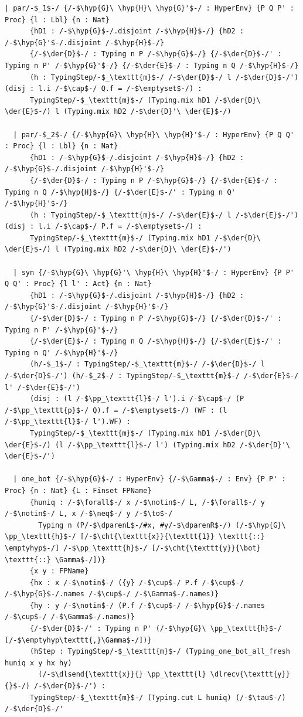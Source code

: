 \begin{lstlisting}[language=Lean4,
  caption={The typed transition relation \texttt{TypingStep}$_{\texttt{m}}$.},
  label={lst:app-typingstep}]
  | par/-$_1$-/ {/-$\hyp{G}\ \hyp{H}\ \hyp{G}'$-/ : HyperEnv} {P Q P' : Proc} {l : Lbl} {n : Nat}
      {hD1 : /-$\hyp{G}$-/.disjoint /-$\hyp{H}$-/} {hD2 : /-$\hyp{G}'$-/.disjoint /-$\hyp{H}$-/}
      {/-$\der{D}$-/ : Typing n P /-$\hyp{G}$-/} {/-$\der{D}$-/' : Typing n P' /-$\hyp{G}'$-/} {/-$\der{E}$-/ : Typing n Q /-$\hyp{H}$-/}
      (h : TypingStep/-$_\texttt{m}$-/ /-$\der{D}$-/ l /-$\der{D}$-/') (disj : l.i /-$\cap$-/ Q.f = /-$\emptyset$-/) :
      TypingStep/-$_\texttt{m}$-/ (Typing.mix hD1 /-$\der{D}\ \der{E}$-/) l (Typing.mix hD2 /-$\der{D}'\ \der{E}$-/)

  | par/-$_2$-/ {/-$\hyp{G}\ \hyp{H}\ \hyp{H}'$-/ : HyperEnv} {P Q Q' : Proc} {l : Lbl} {n : Nat}
      {hD1 : /-$\hyp{G}$-/.disjoint /-$\hyp{H}$-/} {hD2 : /-$\hyp{G}$-/.disjoint /-$\hyp{H}'$-/}
      {/-$\der{D}$-/ : Typing n P /-$\hyp{G}$-/} {/-$\der{E}$-/ : Typing n Q /-$\hyp{H}$-/} {/-$\der{E}$-/' : Typing n Q' /-$\hyp{H}'$-/}
      (h : TypingStep/-$_\texttt{m}$-/ /-$\der{E}$-/ l /-$\der{E}$-/') (disj : l.i /-$\cap$-/ P.f = /-$\emptyset$-/) :
      TypingStep/-$_\texttt{m}$-/ (Typing.mix hD1 /-$\der{D}\ \der{E}$-/) l (Typing.mix hD2 /-$\der{D}\ \der{E}$-/')

  | syn {/-$\hyp{G}\ \hyp{G}'\ \hyp{H}\ \hyp{H}'$-/ : HyperEnv} {P P' Q Q' : Proc} {l l' : Act} {n : Nat}
      {hD1 : /-$\hyp{G}$-/.disjoint /-$\hyp{H}$-/} {hD2 : /-$\hyp{G}'$-/.disjoint /-$\hyp{H}'$-/}
      {/-$\der{D}$-/ : Typing n P /-$\hyp{G}$-/} {/-$\der{D}$-/' : Typing n P' /-$\hyp{G}'$-/}
      {/-$\der{E}$-/ : Typing n Q /-$\hyp{H}$-/} {/-$\der{E}$-/' : Typing n Q' /-$\hyp{H}'$-/}
      (h/-$_1$-/ : TypingStep/-$_\texttt{m}$-/ /-$\der{D}$-/ l /-$\der{D}$-/') (h/-$_2$-/ : TypingStep/-$_\texttt{m}$-/ /-$\der{E}$-/ l' /-$\der{E}$-/')
      (disj : (l /-$\pp_\texttt{l}$-/ l').i /-$\cap$-/ (P /-$\pp_\texttt{p}$-/ Q).f = /-$\emptyset$-/) (WF : (l /-$\pp_\texttt{l}$-/ l').WF) :
      TypingStep/-$_\texttt{m}$-/ (Typing.mix hD1 /-$\der{D}\ \der{E}$-/) (l /-$\pp_\texttt{l}$-/ l') (Typing.mix hD2 /-$\der{D}'\ \der{E}$-/')

  | one_bot {/-$\hyp{G}$-/ : HyperEnv} {/-$\Gamma$-/ : Env} {P P' : Proc} {n : Nat} {L : Finset FPName}
      {huniq : /-$\forall$-/ x /-$\notin$-/ L, /-$\forall$-/ y /-$\notin$-/ L, x /-$\neq$-/ y /-$\to$-/
        Typing n (P/-$\dparenL$-/#x, #y/-$\dparenR$-/) (/-$\hyp{G}\ \pp_\texttt{h}$-/ [/-$\cht{\texttt{x}}{\texttt{1}} \texttt{::} \emptyhyp$-/] /-$\pp_\texttt{h}$-/ [/-$\cht{\texttt{y}}{\bot} \texttt{::} \Gamma$-/])}
      {x y : FPName}
      {hx : x /-$\notin$-/ ({y} /-$\cup$-/ P.f /-$\cup$-/ /-$\hyp{G}$-/.names /-$\cup$-/ /-$\Gamma$-/.names)}
      {hy : y /-$\notin$-/ (P.f /-$\cup$-/ /-$\hyp{G}$-/.names /-$\cup$-/ /-$\Gamma$-/.names)}
      {/-$\der{D}$-/' : Typing n P' (/-$\hyp{G}\ \pp_\texttt{h}$-/ [/-$\emptyhyp\texttt{,}\Gamma$-/])}
      (hStep : TypingStep/-$_\texttt{m}$-/ (Typing_one_bot_all_fresh huniq x y hx hy)
        (/-$\dlsend{\texttt{x}}{} \pp_\texttt{l} \dlrecv{\texttt{y}}{}$-/) /-$\der{D}$-/') :
      TypingStep/-$_\texttt{m}$-/ (Typing.cut L huniq) (/-$\tau$-/) /-$\der{D}$-/'


\end{lstlisting}
